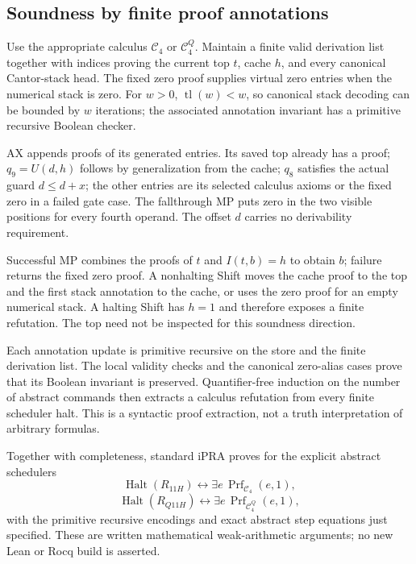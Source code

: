 \subsection{Soundness by finite proof annotations}

Use the appropriate calculus $\mathcal C_4$ or $\mathcal C_4^Q$.
Maintain a finite valid derivation list together with indices
proving the current top $t$, cache $h$, and every canonical
Cantor-stack head. The fixed zero proof supplies virtual zero
entries when the numerical stack is zero. For $w>0$,
$\operatorname{tl}(w)<w$, so canonical stack decoding can be
bounded by $w$ iterations; the associated annotation invariant
has a primitive recursive Boolean checker.

AX appends proofs of its generated entries. Its saved top already
has a proof; $q_9=U(d,h)$ follows by generalization from the cache;
$q_8$ satisfies the actual guard $d\le d+x$; the other entries
are its selected calculus axioms or the fixed zero in a failed
gate case. The fallthrough MP puts zero in the two visible
positions for every fourth operand. The offset $d$ carries no
derivability requirement.

Successful MP combines the proofs of $t$ and $I(t,b)=h$ to obtain
$b$; failure returns the fixed zero proof. A nonhalting Shift
moves the cache proof to the top and the first stack annotation
to the cache, or uses the zero proof for an empty numerical stack.
A halting Shift has $h=1$ and therefore exposes a finite
refutation. The top need not be inspected for this soundness
direction.

Each annotation update is primitive recursive on the store and
the finite derivation list. The local validity checks and the
canonical zero-alias cases prove that its Boolean invariant is
preserved. Quantifier-free induction on the number of abstract
commands then extracts a calculus refutation from every finite
scheduler halt. This is a syntactic proof extraction, not a
truth interpretation of arbitrary formulas.

Together with completeness, standard iPRA proves for the explicit
abstract schedulers
\[
 \operatorname{Halt}(R_{11H})\leftrightarrow
          \exists e\,\operatorname{Prf}_{\mathcal C_4}(e,1),
\]
\[
 \operatorname{Halt}(R_{Q11H})\leftrightarrow
          \exists e\,\operatorname{Prf}_{\mathcal C_4^Q}(e,1),
\]
with the primitive recursive encodings and exact abstract step
equations just specified. These are written mathematical
weak-arithmetic arguments; no new Lean or Rocq build is asserted.

